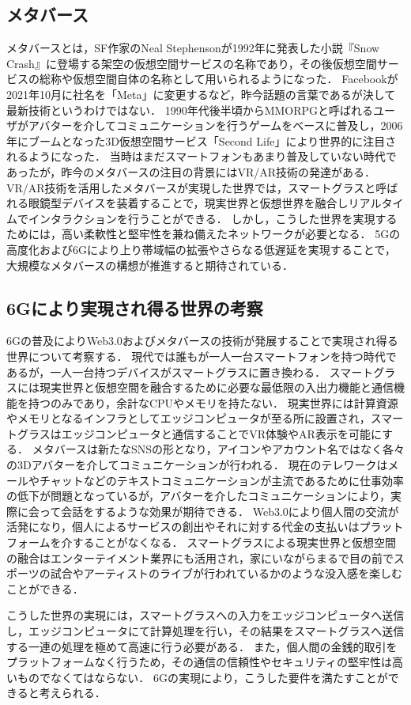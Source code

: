 \documentclass[a4paper,10pt,uplatex]{jsarticle}
\begin{document}
\subsection{メタバース}
メタバースとは，SF作家のNeal Stephensonが1992年に発表した小説『Snow Crash』に登場する架空の仮想空間サービスの名称であり，その後仮想空間サービスの総称や仮想空間自体の名称として用いられるようになった．
Facebookが2021年10月に社名を「Meta」に変更するなど，昨今話題の言葉であるが決して最新技術というわけではない．
1990年代後半頃からMMORPGと呼ばれるユーザがアバターを介してコミュニケーションを行うゲームをベースに普及し，2006年にブームとなった3D仮想空間サービス「Second Life」により世界的に注目されるようになった．
当時はまだスマートフォンもあまり普及していない時代であったが，昨今のメタバースの注目の背景にはVR/AR技術の発達がある．
VR/AR技術を活用したメタバースが実現した世界では，スマートグラスと呼ばれる眼鏡型デバイスを装着することで，現実世界と仮想世界を融合しリアルタイムでインタラクションを行うことができる．
しかし，こうした世界を実現するためには，高い柔軟性と堅牢性を兼ね備えたネットワークが必要となる．
5Gの高度化および6Gにより上り帯域幅の拡張やさらなる低遅延を実現することで，大規模なメタバースの構想が推進すると期待されている\cite{Nokia}．

\subsection{6Gにより実現され得る世界の考察}
\label{6Gにより実現され得る世界の考察}
6Gの普及によりWeb3.0およびメタバースの技術が発展することで実現され得る世界について考察する．
現代では誰もが一人一台スマートフォンを持つ時代であるが，一人一台持つデバイスがスマートグラスに置き換わる．
スマートグラスには現実世界と仮想空間を融合するために必要な最低限の入出力機能と通信機能を持つのみであり，余計なCPUやメモリを持たない．
現実世界には計算資源やメモリとなるインフラとしてエッジコンピュータが至る所に設置され，スマートグラスはエッジコンピュータと通信することでVR体験やAR表示を可能にする．
メタバースは新たなSNSの形となり，アイコンやアカウント名ではなく各々の3Dアバターを介してコミュニケーションが行われる．
現在のテレワークはメールやチャットなどのテキストコミュニケーションが主流であるために仕事効率の低下が問題となっている\cite{Microsoft}が，アバターを介したコミュニケーションにより，実際に会って会話をするような効果が期待できる．
Web3.0により個人間の交流が活発になり，個人によるサービスの創出やそれに対する代金の支払いはプラットフォームを介することがなくなる．
スマートグラスによる現実世界と仮想空間の融合はエンターテイメント業界にも活用され，家にいながらまるで目の前でスポーツの試合やアーティストのライブが行われているかのような没入感を楽しむことができる．\par
こうした世界の実現には，スマートグラスへの入力をエッジコンピュータへ送信し，エッジコンピュータにて計算処理を行い，その結果をスマートグラスへ送信する一連の処理を極めて高速に行う必要がある．
また，個人間の金銭的取引をプラットフォームなく行うため，その通信の信頼性やセキュリティの堅牢性は高いものでなくてはならない．
6Gの実現により，こうした要件を満たすことができると考えられる．
\end{document}
